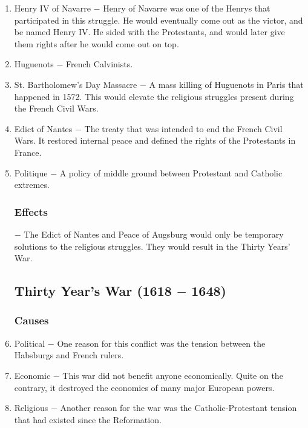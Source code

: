 \documentclass[12pt]{article}
\begin{document}
\begin{enumerate}
\item Henry IV of Navarre $-$ Henry of Navarre was one of the Henrys that participated in this struggle. He would eventually come out as the victor, and be named Henry IV. He sided with the Protestants, and would later give them rights after he would come out on top.

\item Huguenots $-$ French Calvinists.

\item St. Bartholomew's Day Massacre $-$ A mass killing of Huguenots in Paris that happened in 1572. This would elevate the religious struggles present during the French Civil Wars.

\item Edict of Nantes $-$ The treaty that was intended to end the French Civil Wars. It restored internal peace and defined the rights of the Protestants in France. 

\item Politique $-$ A policy of middle ground between Protestant and Catholic extremes.

\subsubsection{Effects} $-$ The Edict of Nantes and Peace of Augsburg would only be temporary solutions to the religious struggles. They would result in the Thirty Years' War.

\subsection{Thirty Year's War (1618 $-$ 1648)}

\subsubsection{Causes}

\item Political $-$ One reason for this conflict was the tension between the Habsburgs and French rulers.

\item Economic $-$ This war did not benefit anyone economically. Quite on the contrary, it destroyed the economies of many major European powers.

\item Religious $-$ Another reason for the war was the Catholic-Protestant tension that had existed since the Reformation.


\end{enumerate}
\end{document}

